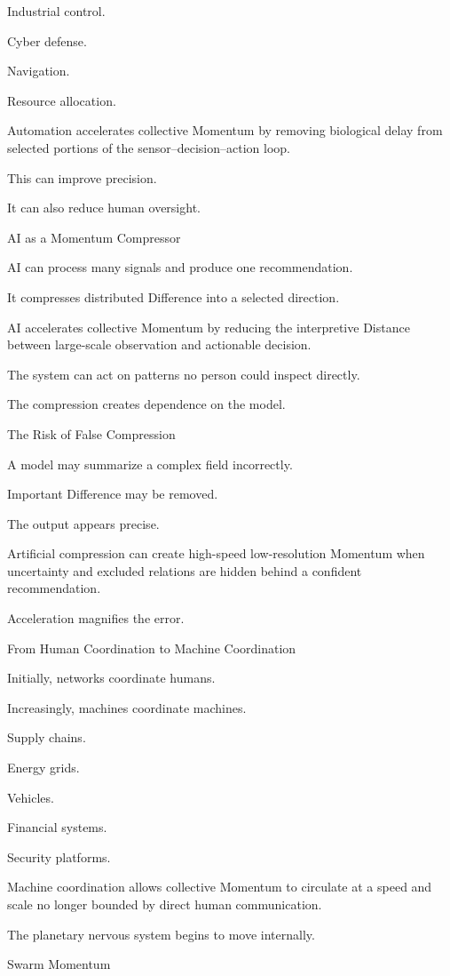 Industrial control.

Cyber defense.

Navigation.

Resource allocation.

Automation accelerates collective Momentum by removing biological delay from selected portions of the sensor–decision–action loop.

This can improve precision.

It can also reduce human oversight.

AI as a Momentum Compressor

AI can process many signals and produce one recommendation.

It compresses distributed Difference into a selected direction.

AI accelerates collective Momentum by reducing the interpretive Distance between large-scale observation and actionable decision.

The system can act on patterns no person could inspect directly.

The compression creates dependence on the model.

The Risk of False Compression

A model may summarize a complex field incorrectly.

Important Difference may be removed.

The output appears precise.

Artificial compression can create high-speed low-resolution Momentum when uncertainty and excluded relations are hidden behind a confident recommendation.

Acceleration magnifies the error.

From Human Coordination to Machine Coordination

Initially, networks coordinate humans.

Increasingly, machines coordinate machines.

Supply chains.

Energy grids.

Vehicles.

Financial systems.

Security platforms.

Machine coordination allows collective Momentum to circulate at a speed and scale no longer bounded by direct human communication.

The planetary nervous system begins to move internally.

Swarm Momentum

